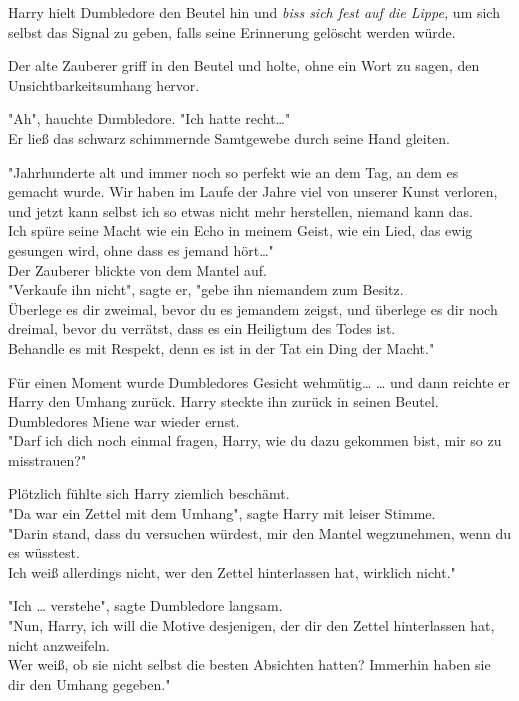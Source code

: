 {Harry hielt Dumbledore den Beutel hin und \emph{biss sich fest auf die Lippe,} um sich selbst das Signal zu geben, falls seine Erinnerung gelöscht werden würde.

Der alte Zauberer griff in den Beutel und holte, ohne ein Wort zu sagen, den Unsichtbarkeitsumhang hervor.

"Ah", hauchte Dumbledore. "Ich hatte recht…"\\ Er ließ das schwarz schimmernde Samtgewebe durch seine Hand gleiten.

"Jahrhunderte alt und immer noch so perfekt wie an dem Tag, an dem es gemacht wurde. Wir haben im Laufe der Jahre viel von unserer Kunst verloren, und jetzt kann selbst ich so etwas nicht mehr herstellen, niemand kann das.\\ Ich spüre seine Macht wie ein Echo in meinem Geist, wie ein Lied, das ewig gesungen wird, ohne dass es jemand hört…"\\ Der Zauberer blickte von dem Mantel auf.\\ "Verkaufe ihn nicht", sagte er, "gebe ihn niemandem zum Besitz.\\ Überlege es dir zweimal, bevor du es jemandem zeigst, und überlege es dir noch dreimal, bevor du verrätst, dass es ein Heiligtum des Todes ist.\\ Behandle es mit Respekt, denn es ist in der Tat ein Ding der Macht."

Für einen Moment wurde Dumbledores Gesicht wehmütig… … und dann reichte er Harry den Umhang zurück. Harry steckte ihn zurück in seinen Beutel. Dumbledores Miene war wieder ernst.\\ "Darf ich dich noch einmal fragen, Harry, wie du dazu gekommen bist, mir so zu misstrauen?"

Plötzlich fühlte sich Harry ziemlich beschämt.\\ "Da war ein Zettel mit dem Umhang", sagte Harry mit leiser Stimme.\\ "Darin stand, dass du versuchen würdest, mir den Mantel wegzunehmen, wenn du es wüsstest.\\ Ich weiß allerdings nicht, wer den Zettel hinterlassen hat, wirklich nicht."

"Ich … verstehe", sagte Dumbledore langsam.\\ "Nun, Harry, ich will die Motive desjenigen, der dir den Zettel hinterlassen hat, nicht anzweifeln.\\ Wer weiß, ob sie nicht selbst die besten Absichten hatten? Immerhin haben sie dir den Umhang gegeben."

}
